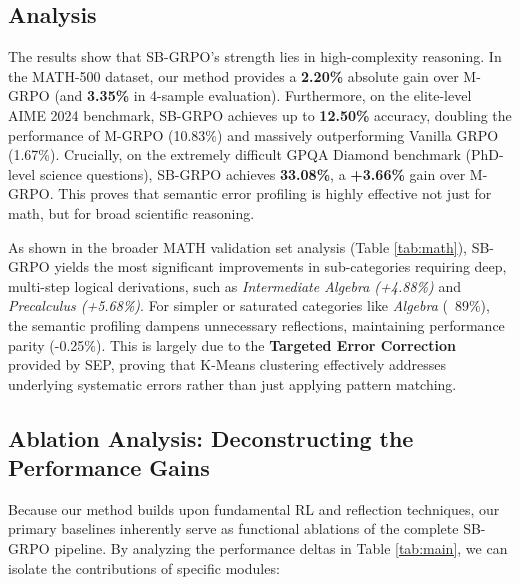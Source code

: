 \subsection{Analysis}
The results show that SB-GRPO's strength lies in high-complexity reasoning. In the MATH-500 dataset, our method provides a \textbf{2.20\%} absolute gain over M-GRPO (and \textbf{3.35\%} in 4-sample evaluation). Furthermore, on the elite-level AIME 2024 benchmark, SB-GRPO achieves up to \textbf{12.50\%} accuracy, doubling the performance of M-GRPO (10.83\%) and massively outperforming Vanilla GRPO (1.67\%). Crucially, on the extremely difficult GPQA Diamond benchmark (PhD-level science questions), SB-GRPO achieves \textbf{33.08\%}, a \textbf{+3.66\%} gain over M-GRPO. This proves that semantic error profiling is highly effective not just for math, but for broad scientific reasoning.

As shown in the broader MATH validation set analysis (Table \ref{tab:math}), SB-GRPO yields the most significant improvements in sub-categories requiring deep, multi-step logical derivations, such as \textit{Intermediate Algebra (+4.88\%)} and \textit{Precalculus (+5.68\%)}. For simpler or saturated categories like \textit{Algebra} (~89\%), the semantic profiling dampens unnecessary reflections, maintaining performance parity (-0.25\%). This is largely due to the \textbf{Targeted Error Correction} provided by SEP, proving that K-Means clustering effectively addresses underlying systematic errors rather than just applying pattern matching.

\subsection{Ablation Analysis: Deconstructing the Performance Gains}
Because our method builds upon fundamental RL and reflection techniques, our primary baselines inherently serve as functional ablations of the complete SB-GRPO pipeline. By analyzing the performance deltas in Table \ref{tab:main}, we can isolate the contributions of specific modules:

